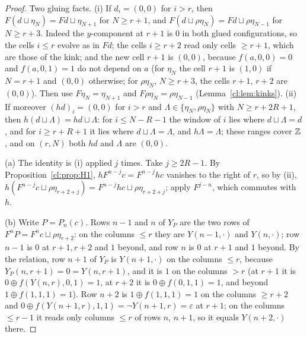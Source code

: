 \begin{proof}
Two gluing facts. (i) If $d_i=(0,0)$ for $i>r$, then $F(d\sqcup\eta_N)=Fd\sqcup\eta_{N+1}$ for $N\ge r+1$, and $F(d\sqcup\rho\eta_N)=Fd\sqcup\rho\eta_{N-1}$ for $N\ge r+3$. Indeed the $y$-component at $r+1$ is $0$ in both glued configurations, so the cells $i\le r$ evolve as in $Fd$; the cells $i\ge r+2$ read only cells $\ge r+1$, which are those of the kink; and the new cell $r+1$ is $(0,0)$, because $f(a,0,0)=0$ and $f(a,0,1)=1$ do not depend on $a$ (for $\eta_N$ the cell $r+1$ is $(1,0)$ if $N=r+1$ and $(0,0)$ otherwise; for $\rho\eta_N$, $N\ge r+3$, the cells $r+1$, $r+2$ are $(0,0)$). Then use $F\eta_N=\eta_{N+1}$ and $F\rho\eta_N=\rho\eta_{N-1}$ (Lemma~\ref{cl:lem:kinks}). (ii) If moreover $(hd)_i=(0,0)$ for $i>r$ and $\Lambda\in\{\eta_N,\rho\eta_N\}$ with $N\ge r+2R+1$, then $h(d\sqcup\Lambda)=hd\sqcup\Lambda$: for $i\le N-R-1$ the window of $i$ lies where $d\sqcup\Lambda=d$, and for $i\ge r+R+1$ it lies where $d\sqcup\Lambda=\Lambda$, and $h\Lambda=\Lambda$; these ranges cover $\mathbb{Z}$, and on $(r,N)$ both $hd$ and $\Lambda$ are $(0,0)$.

(a) The identity is (i) applied $j$ times. Take $j\ge 2R-1$. By Proposition~\ref{cl:prop:H1}, $hF^{n-j}c=F^{n-j}hc$ vanishes to the right of $r$, so by (ii), $h(F^{n-j}c\sqcup\rho\eta_{r+2+j})=F^{n-j}hc\sqcup\rho\eta_{r+2+j}$; apply $F^{j-n}$, which commutes with $h$.

(b) Write $P=P_n(c)$. Rows $n-1$ and $n$ of $Y_P$ are the two rows of $F^nP=F^nc\sqcup\rho\eta_{r+2}$: on the columns $\le r$ they are $Y(n-1,\cdot)$ and $Y(n,\cdot)$; row $n-1$ is $0$ at $r+1,r+2$ and $1$ beyond, and row $n$ is $0$ at $r+1$ and $1$ beyond. By the relation, row $n+1$ of $Y_P$ is $Y(n+1,\cdot)$ on the columns $\le r$, because $Y_P(n,r+1)=0=Y(n,r+1)$, and it is $1$ on the columns $>r$ (at $r+1$ it is $0\oplus f(Y(n,r),0,1)=1$, at $r+2$ it is $0\oplus f(0,1,1)=1$, and beyond $1\oplus f(1,1,1)=1$). Row $n+2$ is $1\oplus f(1,1,1)=1$ on the columns $\ge r+2$ and $0\oplus f(Y(n+1,r),1,1)=\neg Y(n+1,r)=\varepsilon$ at $r+1$; on the columns $\le r-1$ it reads only columns $\le r$ of rows $n$, $n+1$, so it equals $Y(n+2,\cdot)$ there.


\end{proof}
